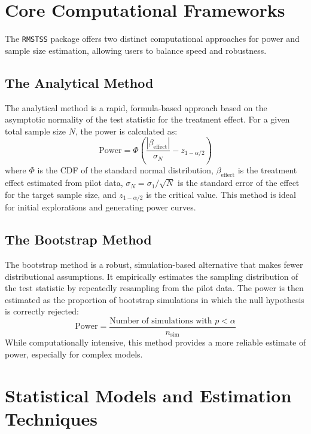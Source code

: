 \documentclass[11pt, a4paper]{article}
\begin{document}
\section{Core Computational Frameworks}
The \texttt{RMSTSS} package offers two distinct computational approaches for power and sample size estimation, allowing users to balance speed and robustness.

\subsection{The Analytical Method}
The analytical method is a rapid, formula-based approach based on the asymptotic normality of the test statistic for the treatment effect. For a given total sample size $N$, the power is calculated as:
\begin{equation}
\text{Power} = \Phi\left( \frac{|\beta_{\text{effect}}|}{\sigma_N} - z_{1-\alpha/2} \right)
\end{equation}
where $\Phi$ is the CDF of the standard normal distribution, $\beta_{\text{effect}}$ is the treatment effect estimated from pilot data, $\sigma_N = \sigma_1 / \sqrt{N}$ is the standard error of the effect for the target sample size, and $z_{1-\alpha/2}$ is the critical value. This method is ideal for initial explorations and generating power curves.

\subsection{The Bootstrap Method}
The bootstrap method is a robust, simulation-based alternative that makes fewer distributional assumptions. It empirically estimates the sampling distribution of the test statistic by repeatedly resampling from the pilot data. The power is then estimated as the proportion of bootstrap simulations in which the null hypothesis is correctly rejected:
\begin{equation}
 \text{Power} = \frac{\text{Number of simulations with } p < \alpha}{n_{\text{sim}}}
\end{equation}
While computationally intensive, this method provides a more reliable estimate of power, especially for complex models.

\clearpage

\section{Statistical Models and Estimation Techniques}
\end{document}
